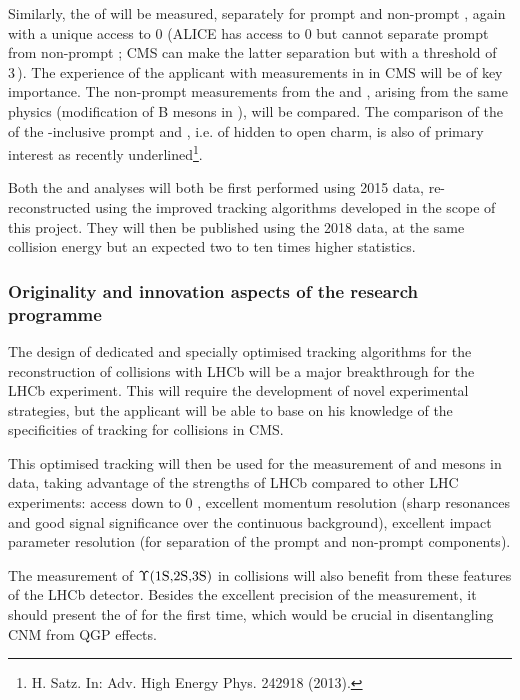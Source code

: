 \documentclass[a4paper,11pt]{article}
\begin{document}
Similarly, the \raa of \Jpsi will be measured, separately for prompt and non-prompt \Jpsi, again with a unique access to 0 \pt (ALICE has access to 0 \pt \Jpsi but cannot separate prompt from non-prompt \Jpsi; CMS can make the latter separation but with a \pt threshold of 3\,\GeVc). The experience of the applicant with \Jpsi measurements in \pbpb
in CMS will be of key importance. The non-prompt measurements from the \Dz and \Jpsi, arising from the same physics (modification of B mesons in \pbpb), will be compared. The comparison of the \raa of the \pt-inclusive prompt \Jpsi and \Dz, i.e. of hidden to open charm, is also of primary interest as recently underlined\footnote{H. Satz. In: Adv. High Energy Phys. 242918 (2013).}.

Both the \Dz and \Jpsi analyses will both be first performed using 2015 \pbpb data, re-reconstructed using the improved tracking algorithms developed in the scope of this project. They will then be published using the 2018 data, at the same collision energy but an expected two to ten times higher statistics.


\subsubsection{Originality and innovation aspects of the research programme}

The design of dedicated and specially optimised tracking algorithms for the reconstruction of \pbpb collisions with LHCb will be a major breakthrough for the LHCb experiment. This will require the development of novel experimental strategies, but the applicant will be able to base on his knowledge of the specificities of tracking for \pbpb collisions in CMS.

This optimised tracking will then be used for the measurement of \Dz and \Jpsi mesons in \pbpb data, taking advantage of the strengths of LHCb compared to other LHC experiments: access down to 0 \pt, excellent momentum resolution (sharp resonances and good signal significance over the continuous background), excellent impact parameter resolution (for separation of the prompt and non-prompt components).

The measurement of $\Upsilon\text{(1S,2S,3S)}$ in \ppb collisions will also benefit from these features of the LHCb detector. Besides the excellent precision of the measurement, it should present the \rpa of \PgUc for the first time, which would be crucial in disentangling CNM from QGP effects.
% 
% 
\end{document}
